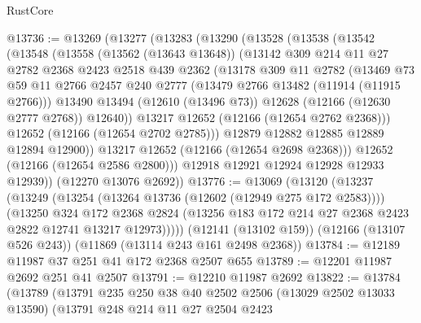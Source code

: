 \begin{lexlean}{RustCore}
\begin{coremodule}
@13736 := @13269
    (@13277
      (@13283
        (@13290
          (@13528
            (@13538
              (@13542
                (@13548
                  (@13558
                    (@13562 (@13643 @13648))
                    (@13142
                      @309
                      @214
                      @11
                      @27
                      @2782
                      @2368
                      @2423
                      @2518
                      @439
                      @2362
                      (@13178
                        @309
                        @11
                        @2782
                        (@13469
                          @73
                          @59
                          @11
                          @2766
                          @2457
                          @240
                          @2777
                          (@13479 @2766 @13482 (@11914 (@11915 @2766)))
                          @13490
                          @13494
                          (@12610 (@13496 @73))
                          @12628
                          (@12166 (@12630 @2777 @2768))
                          @12640))
                      @13217
                      @12652
                      (@12166 (@12654 @2762 @2368)))
                    @12652
                    (@12166 (@12654 @2702 @2785)))
                  @12879
                  @12882
                  @12885
                  @12889
                  @12894
                  @12900))
              @13217
              @12652
              (@12166 (@12654 @2698 @2368)))
            @12652
            (@12166 (@12654 @2586 @2800)))
          @12918
          @12921
          @12924
          @12928
          @12933
          @12939))
      (@12270 @13076 @2692))
@13776 := @13069
    (@13120
      (@13237
        (@13249
          (@13254 (@13264 @13736 (@12602 (@12949 @275 @172 @2583))))
          (@13250
            @324
            @172
            @2368
            @2824
            (@13256 @183 @172 @214 @27 @2368 @2423 @2822 @12741 @13217 @12973)))))
    (@12141 (@13102 @159))
    (@12166 (@13107 @526 @243))
    (@11869 (@13114 @243 @161 @2498 @2368))
@13784 := @12189 @11987 @37 @251 @41 @172 @2368 @2507 @655
@13789 := @12201 @11987 @2692 @251 @41 @2507
@13791 := @12210 @11987 @2692
@13822 := @13784
    (@13789
      (@13791
        @235
        @250
        @38
        @40
        @2502
        @2506
        (@13029 @2502 @13033 @13590)
        (@13791
          @248
          @214
          @11
          @27
          @2504
          @2423

\end{coremodule}
\end{lexlean}
